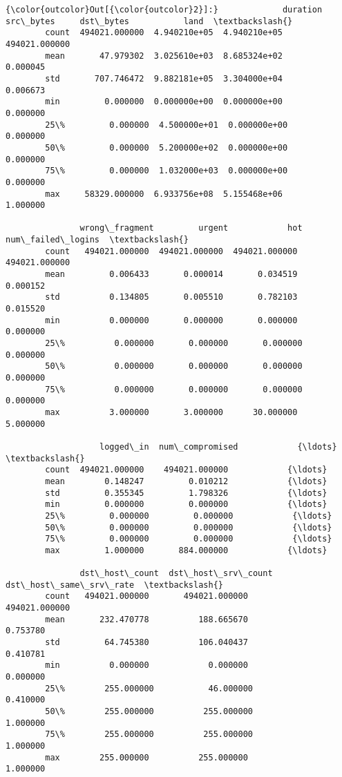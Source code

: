 \documentclass[11pt]{article}
\begin{document}
\begin{Verbatim}[commandchars=\\\{\}]
{\color{outcolor}Out[{\color{outcolor}2}]:}             duration     src\_bytes     dst\_bytes           land  \textbackslash{}
        count  494021.000000  4.940210e+05  4.940210e+05  494021.000000   
        mean       47.979302  3.025610e+03  8.685324e+02       0.000045   
        std       707.746472  9.882181e+05  3.304000e+04       0.006673   
        min         0.000000  0.000000e+00  0.000000e+00       0.000000   
        25\%         0.000000  4.500000e+01  0.000000e+00       0.000000   
        50\%         0.000000  5.200000e+02  0.000000e+00       0.000000   
        75\%         0.000000  1.032000e+03  0.000000e+00       0.000000   
        max     58329.000000  6.933756e+08  5.155468e+06       1.000000   
        
               wrong\_fragment         urgent            hot  num\_failed\_logins  \textbackslash{}
        count   494021.000000  494021.000000  494021.000000      494021.000000   
        mean         0.006433       0.000014       0.034519           0.000152   
        std          0.134805       0.005510       0.782103           0.015520   
        min          0.000000       0.000000       0.000000           0.000000   
        25\%          0.000000       0.000000       0.000000           0.000000   
        50\%          0.000000       0.000000       0.000000           0.000000   
        75\%          0.000000       0.000000       0.000000           0.000000   
        max          3.000000       3.000000      30.000000           5.000000   
        
                   logged\_in  num\_compromised            {\ldots}             \textbackslash{}
        count  494021.000000    494021.000000            {\ldots}              
        mean        0.148247         0.010212            {\ldots}              
        std         0.355345         1.798326            {\ldots}              
        min         0.000000         0.000000            {\ldots}              
        25\%         0.000000         0.000000            {\ldots}              
        50\%         0.000000         0.000000            {\ldots}              
        75\%         0.000000         0.000000            {\ldots}              
        max         1.000000       884.000000            {\ldots}              
        
               dst\_host\_count  dst\_host\_srv\_count  dst\_host\_same\_srv\_rate  \textbackslash{}
        count   494021.000000       494021.000000           494021.000000   
        mean       232.470778          188.665670                0.753780   
        std         64.745380          106.040437                0.410781   
        min          0.000000            0.000000                0.000000   
        25\%        255.000000           46.000000                0.410000   
        50\%        255.000000          255.000000                1.000000   
        75\%        255.000000          255.000000                1.000000   
        max        255.000000          255.000000                1.000000   
        

\end{Verbatim}
\end{document}
